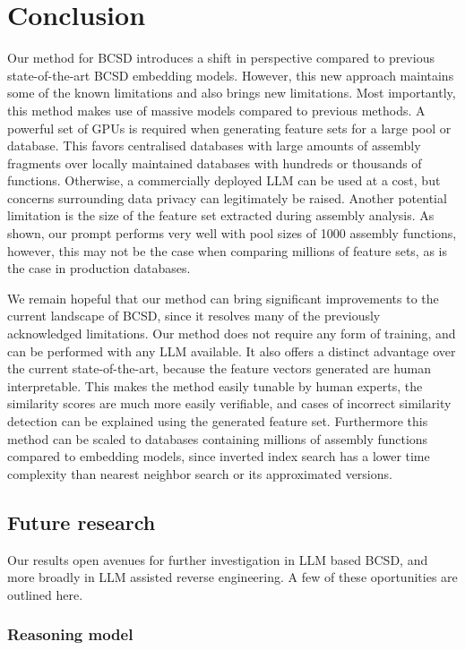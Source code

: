 \section{Conclusion}

Our method for BCSD introduces a shift in perspective compared to previous state-of-the-art BCSD embedding models. However,
this new approach maintains some of the known limitations and also brings new limitations. Most importantly, this
method makes use of massive models compared to previous methods. A powerful set of GPUs is required when generating
feature sets for a large pool or database. This favors centralised databases with large amounts of assembly fragments over
locally maintained databases with hundreds or thousands of functions. Otherwise, a commercially deployed LLM can be used at a
cost, but concerns surrounding data privacy can legitimately be raised. Another potential limitation is the size of the feature
set extracted during assembly analysis. As shown, our prompt performs very well with pool sizes of 1000 assembly functions,
however, this may not be the case when comparing millions of feature sets, as is the case in production databases.

We remain hopeful that our method can bring significant improvements to the current landscape of BCSD, since it resolves
many of the previously acknowledged limitations. Our method does not require any form of training, and can be performed with any LLM
available. It also offers a distinct advantage over the current state-of-the-art, because the feature vectors generated are human
interpretable. This makes the method easily tunable by human experts, the similarity scores are much more easily verifiable, and
cases of incorrect similarity detection can be explained using the generated feature set. Furthermore this method can be scaled to
databases containing millions of assembly functions compared to embedding models, since inverted index search has a lower time
complexity than nearest neighbor search or its approximated versions.

\subsection{Future research}

Our results open avenues for further investigation in LLM based BCSD, and more broadly in LLM assisted reverse engineering.
A few of these oportunities are outlined here.

\subsubsection{Reasoning model}

